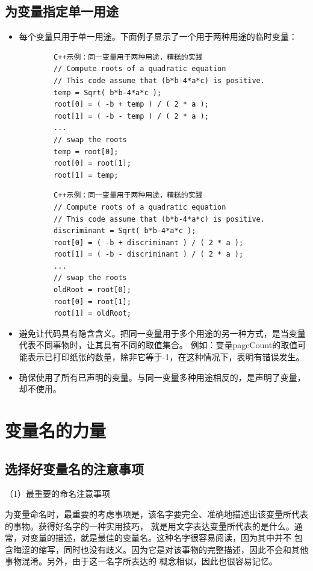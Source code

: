 \documentclass{article}
\begin{document}
\subsection{为变量指定单一用途}
\begin{itemize}
    \item 每个变量只用于单一用途。下面例子显示了一个用于两种用途的临时变量：
    \begin{lstlisting}
        C++示例：同一变量用于两种用途，糟糕的实践
        // Compute roots of a quadratic equation
        // This code assume that (b*b-4*a*c) is positive.
        temp = Sqrt( b*b-4*a*c );
        root[0] = ( -b + temp ) / ( 2 * a );
        root[1] = ( -b - temp ) / ( 2 * a );
        ...
        // swap the roots
        temp = root[0];
        root[0] = root[1];
        root[1] = temp;
    \end{lstlisting}
    \begin{lstlisting}
        C++示例：同一变量用于两种用途，糟糕的实践
        // Compute roots of a quadratic equation
        // This code assume that (b*b-4*a*c) is positive.
        discriminant = Sqrt( b*b-4*a*c );
        root[0] = ( -b + discriminant ) / ( 2 * a );
        root[1] = ( -b - discriminant ) / ( 2 * a );
        ...
        // swap the roots
        oldRoot = root[0];
        root[0] = root[1];
        root[1] = oldRoot;
    \end{lstlisting}
    \item 避免让代码具有隐含含义。把同一变量用于多个用途的另一种方式，是当变量代表不同事物时，让其具有不同的取值集合。
    例如：变量pageCount的取值可能表示已打印纸张的数量，除非它等于-1，在这种情况下，表明有错误发生。
    \item 确保使用了所有已声明的变量。与同一变量多种用途相反的，是声明了变量，却不使用。
\end{itemize}

\section{变量名的力量}
\subsection{选择好变量名的注意事项}
\par
（1）最重要的命名注意事项
\par
为变量命名时，最重要的考虑事项是，该名字要完全、准确地描述出该变量所代表的事物。获得好名字的一种实用技巧，
就是用文字表达变量所代表的是什么。通常，对变量的描述，就是最佳的变量名。这种名字很容易阅读，因为其中并不
包含晦涩的缩写，同时也没有歧义。因为它是对该事物的完整描述，因此不会和其他事物混淆。另外，由于这一名字所表达的
概念相似，因此也很容易记忆。
\end{document}
